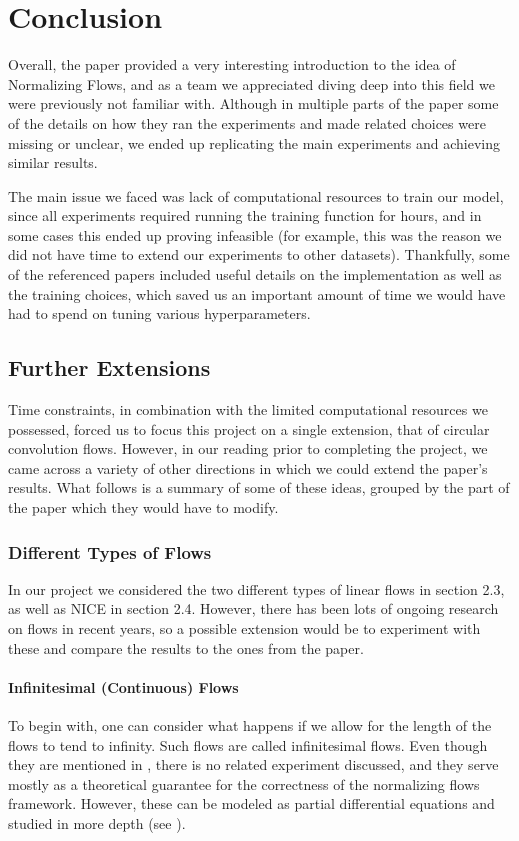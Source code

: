 \chapter{Conclusion}

Overall, the paper \cite{main} provided a very interesting introduction to the idea of Normalizing Flows, and as a team we appreciated diving deep into this field we were previously not familiar with. Although in multiple parts of the paper some of the details on how they ran the experiments and made related choices were missing or unclear, we ended up replicating the main experiments and achieving similar results.

The main issue we faced was lack of computational resources to train our model, since all experiments required running the training function for hours, and in some cases this ended up proving infeasible (for example, this was the reason we did not have time to extend our experiments to other datasets). Thankfully, some of the referenced papers included useful details on the implementation as well as the training choices, which saved us an important amount of time we would have had to spend on tuning various hyperparameters.


\section{Further Extensions}
Time constraints, in combination with the limited computational resources we possessed, forced us to focus this project on a single extension, that of circular convolution flows.  However, in our reading prior to completing the project, we came across a variety of other directions in which we could extend the paper's results. What follows is a summary of some of these ideas, grouped by the part of the paper which they would have to modify.

\subsection{Different Types of Flows}
In our project we considered the two different types of linear flows in section 2.3, as well as NICE in section 2.4. However, there has been lots of ongoing research on flows in recent years, so a possible extension would be to experiment with these and compare the results to the ones from the paper.

\subsubsection{Infinitesimal (Continuous) Flows}
To begin with, one can consider what happens if we allow for the length of the flows to tend to infinity. Such flows are called infinitesimal flows. Even though they are mentioned in \cite{main}, there is no related experiment discussed, and they serve mostly as a theoretical guarantee for the correctness of the normalizing flows framework. However, these can be modeled as partial differential equations and studied in more depth (see \cite{inf_flows}).

